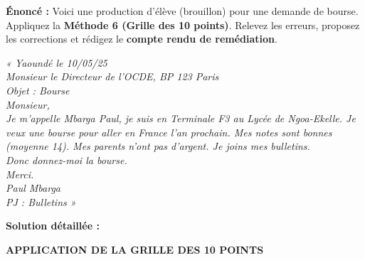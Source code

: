 \documentclass[11pt]{article}
\begin{document}
\begin{exoresolu}
\textbf{Énoncé :} Voici une production d'élève (brouillon) pour une demande de bourse. Appliquez la \textbf{Méthode 6 (Grille des 10 points)}. Relevez les erreurs, proposez les corrections et rédigez le \textbf{compte rendu de remédiation}.

\emph{« Yaoundé le 10/05/25 \\
Monsieur le Directeur de l'OCDE, BP 123 Paris \\
Objet : Bourse \\
Monsieur, \\
Je m'appelle Mbarga Paul, je suis en Terminale F3 au Lycée de Ngoa-Ekelle. Je veux une bourse pour aller en France l'an prochain. Mes notes sont bonnes (moyenne 14). Mes parents n'ont pas d'argent. Je joins mes bulletins. \\
Donc donnez-moi la bourse. \\
Merci. \\
Paul Mbarga \\
PJ : Bulletins »}

\tcblower
\textbf{Solution détaillée :}

\textbf{APPLICATION DE LA GRILLE DES 10 POINTS}


\end{exoresolu}
\end{document}

